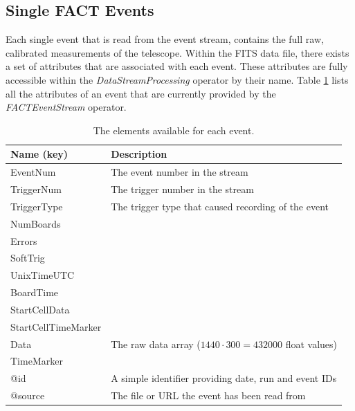 \subsection*{Single FACT Events}
Each single event that is read from the event stream, contains the
full raw, calibrated measurements of the telescope. Within the FITS
data file, there exists a set of attributes that are associated with
each event. These attributes are fully accessible within the {\em
  DataStreamProcessing} operator by their name. Table \ref{tab:factEventKeys}
lists all the attributes of an event that are currently provided by
the {\em FACTEventStream} operator.
\begin{table}[h!]
\renewcommand{\arraystretch}{1.25}
  \begin{center}
    \begin{tabular}{l|l} \hline
      {\bf Name (key)} & {\bf Description} \\ \hline \hline
      {\ttfamily EventNum} & The event number in the stream \\ \hline
      {\ttfamily TriggerNum} & The trigger number in the stream \\ \hline
      {\ttfamily TriggerType} & The trigger type that caused recording of the event \\ \hline
      {\ttfamily NumBoards} & \\ \hline
      {\ttfamily Errors} & \\ \hline
      {\ttfamily SoftTrig} & \\ \hline
      {\ttfamily UnixTimeUTC} & \\ \hline
      {\ttfamily BoardTime} & \\ \hline
      {\ttfamily StartCellData} & \\ \hline
      {\ttfamily StartCellTimeMarker} & \\ \hline
      {\ttfamily Data} & The raw data array ($1440\cdot 300 = 432000$ float values) \\ \hline
      {\ttfamily TimeMarker} & \\ \hline
      {\ttfamily @id} & A simple identifier providing date, run and event IDs \\ \hline
      {\ttfamily @source} & The file or URL the event has been read from \\ \hline
    \end{tabular}
  \end{center}
  \caption{\label{tab:factEventKeys} The elements available for each event.}
\end{table}


